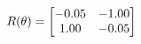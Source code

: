 \documentclass[preview]{standalone}
\begin{document}
\begin{align*}
\special{dvisvgm:raw <g id='unique000'>}R(\theta) = \begin{bmatrix}-0.05 & -1.00\\1.00 & -0.05\end{bmatrix}\special{dvisvgm:raw </g>}
\end{align*}
\end{document}
